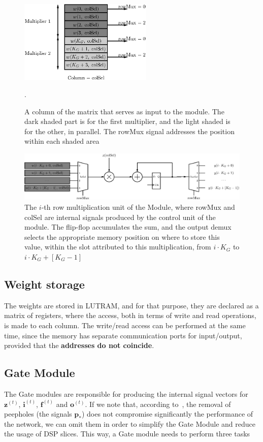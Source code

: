 \documentclass{IEEEtran}
\newcommand{\mb}[1]{\mathbf{#1}}
\begin{document}
\begin{figure}
    \centering
    \includegraphics[width=2.5in]{figures/mem-array-prod.eps}
    \caption{A column of the matrix that serves as input to the module. The dark shaded part is for the first multiplier, and the light shaded is for the other, in parallel. The rowMux signal addresses the position within each shaded area}.
    \label{fig:mem-arrayprod}
\end{figure}

\begin{figure}[!t]
    \centering
    \includegraphics[width=\linewidth]{figures/array-prod.eps}
    \caption{The $i$-th row multiplication unit of the Module, where rowMux and colSel are internal signals produced by the control unit of the module. The flip-flop accumulates the sum, and the output demux selects the appropriate memory position on where to store this value, within the slot attributed to this multiplication, from $i\cdot K_G$ to $i\cdot K_G + \left[K_G-1\right]$}
    \label{fig:array-prod}
\end{figure}

\subsection{Weight storage}\label{sec:proprarch_ram}
The weights are stored in LUTRAM, and for that purpose, they are declared as a matrix of registers, where the access, both in terms
of write and read operations, is made to each column. The write/read access can be performed at the same time, since the memory has
separate communication ports for input/output, provided that the \textbf{addresses do not coincide}.

\subsection{Gate Module}\label{sec:proparch_gate}
The Gate modules are responsible for producing the internal signal vectors for $\mb{z}^{(t)}$, $\mb{i}^{(t)}$, $\mb{f}^{(t)}$ and $\mb{o}^{(t)}$. If we
note that, according to~\cite{Greff15}, the removal of peepholes (the signals $\mb{p}_*$) does not compromise significantly the performance of the network,
we can omit them in order to simplify the Gate Module and reduce the usage of DSP slices. This way, a Gate module needs to perform three tasks
\end{document}
